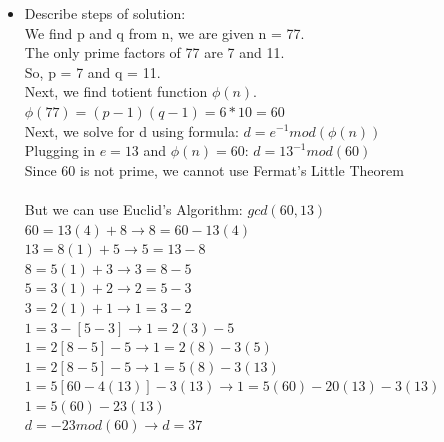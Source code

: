 \documentclass{article}
\begin{document}
\begin{solution}
\begin{itemize}
%
\item Describe steps of solution:\\
	We find p and q from n, we are given n = 77.\\ 
	The only prime factors of 77 are 7 and 11.\\
	So, p = 7 and q = 11.\\
	
	Next, we find totient function $\phi(n)$.\\ $\phi(77) = (p-1)(q-1) = 6*10 = 60$\\
	
	Next, we solve for d using formula: $d = e^{-1}mod(\phi(n))$\\
	Plugging in $e = 13$ and $\phi(n) = 60$: $d = 13^{-1}mod(60)$\\
	 Since 60 is not prime, we cannot use Fermat's Little Theorem\\ 
	\\
	But we can use Euclid's Algorithm: $gcd(60, 13)$\\
	$60 = 13(4) + 8 \rightarrow 8 = 60 - 13(4)$\\
	$13 = 8(1) + 5 \rightarrow 5 = 13 - 8$\\
	$8 = 5(1) + 3 \rightarrow 3 = 8 - 5$\\
	$5 = 3(1) + 2 \rightarrow 2 = 5 - 3$\\
	$3 = 2(1) + 1 \rightarrow 1 = 3 - 2$\\
	
	$1 = 3 - [5 - 3] \rightarrow 1 = 2(3) - 5$\\
	$1 = 2[8 - 5] - 5 \rightarrow 1 = 2(8) - 3(5)$\\
	$1 = 2[8 - 5] - 5 \rightarrow 1 = 5(8) - 3(13)$\\
	$1 = 5[60 - 4(13)] - 3(13) \rightarrow 1 = 5(60) - 20(13) - 3(13)$\\
	$1 = 5(60)-23(13)$\\
	$d = -23 mod(60) \rightarrow d = 37$\\
	

\end{itemize}
\end{solution}
\end{document}

